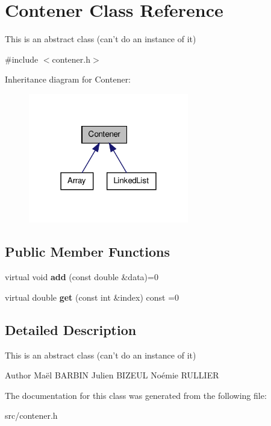 \hypertarget{class_contener}{\section{\-Contener \-Class \-Reference}
\label{class_contener}
}


\-This is an abstract class (can't do an instance of it)  




{\ttfamily \#include $<$contener.\-h$>$}



\-Inheritance diagram for \-Contener\-:
\nopagebreak
\begin{figure}[H]
\begin{center}
\leavevmode
\includegraphics[width=198pt]{class_contener__inherit__graph}
\end{center}
\end{figure}
\subsection*{\-Public \-Member \-Functions}
\begin{DoxyCompactItemize}
\item 
\hypertarget{class_contener_ad7570d2f41e78c8d307b57c80c8de172}{virtual void {\bfseries add} (const double \&data)=0}\label{class_contener_ad7570d2f41e78c8d307b57c80c8de172}

\item 
\hypertarget{class_contener_a3a8d5f861c8c201b388b7f5246d84a6d}{virtual double {\bfseries get} (const int \&index) const =0}\label{class_contener_a3a8d5f861c8c201b388b7f5246d84a6d}

\end{DoxyCompactItemize}


\subsection{\-Detailed \-Description}
\-This is an abstract class (can't do an instance of it) 

\begin{DoxyAuthor}{\-Author}
\-Maël \-B\-A\-R\-B\-I\-N \-Julien \-B\-I\-Z\-E\-U\-L \-Noémie \-R\-U\-L\-L\-I\-E\-R 
\end{DoxyAuthor}


\-The documentation for this class was generated from the following file\-:\begin{DoxyCompactItemize}
\item 
src/contener.\-h\end{DoxyCompactItemize}
